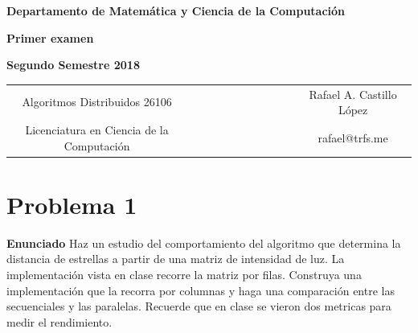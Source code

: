 \documentclass{report}
\begin{document}
\begin{titlepage}
\begin{center}
\end{center}
\begin{center}
{\bf Departamento de Matem\'atica y Ciencia de la Computaci\'on}
\end{center}
\vspace{3cm}
\begin{center}
%
%
{\Large \bf Primer examen}
%
%
\end{center}
\begin{center}
%
%
%
{\large \bf Segundo Semestre 2018}
%
%
\end{center}
\vspace{5cm}
\begin{tabular}{c l c}
%
%
%
Algoritmos Distribuidos 26106 & ~~~~~~~~~~~~~~~~~ & Rafael A. Castillo L\'opez \\
%
%
%
Licenciatura en Ciencia de la Computaci\'on & ~~ & rafael@trfs.me
%
%
\end{tabular}
\end{titlepage}

\chapter{Problema 1}

\textbf{Enunciado} Haz un estudio del comportamiento del algoritmo que determina
la distancia de estrellas a partir de una matriz de intensidad de luz. La
implementaci\'on vista en clase recorre la matriz por filas. Construya una
implementaci\'on que la recorra por columnas y haga una comparaci\'on entre
las secuenciales y las paralelas. Recuerde que en clase se vieron dos metricas
para medir el rendimiento.
\end{document}
